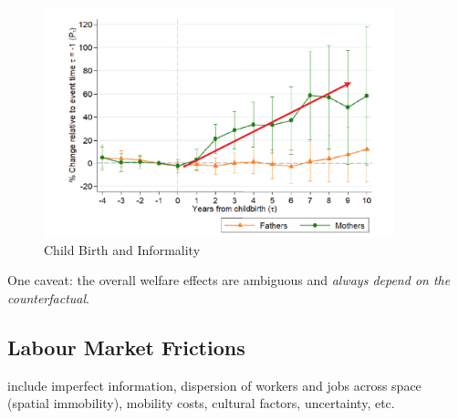             \begin{figure}[H]
                \centering
                \includegraphics[width=4in]{images/ch6/child cost and informality.png}
                \caption{Child Birth and Informality}
            \end{figure}
            One caveat: the overall welfare effects are ambiguous and \emph{always depend on the counterfactual}.
            
    \subsection{Labour Market Frictions}
         include imperfect information, dispersion of workers and jobs across space (spatial immobility), mobility costs, cultural factors, uncertainty, etc.
        
